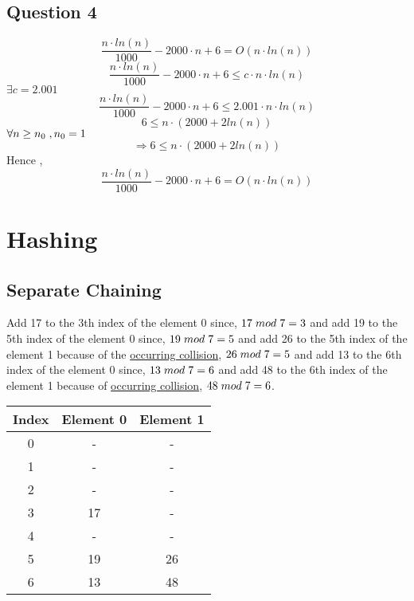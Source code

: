 \documentclass{article}
\begin{document}
\subsection{Question 4}
$$\frac{ n \cdot ln(n)}{1000} - 2000 \cdot n + 6 = O(n \cdot ln(n))$$
$$\frac{ n \cdot ln(n)}{1000} - 2000 \cdot n + 6 \leq c \cdot n \cdot ln(n)$$
$\exists c = 2.001$
$$\frac{ n \cdot ln(n)}{1000} - 2000 \cdot n + 6 \leq 2.001 \cdot n \cdot ln(n)$$
$$6 \leq n \cdot (2000 + 2ln(n))$$
$ \forall n \geq n_0 \hspace{1mm}, n_0 = 1$
$$\Longrightarrow 6 \leq n \cdot (2000 + 2ln(n))$$
Hence , 
$$\frac{ n \cdot ln(n)}{1000} - 2000 \cdot n + 6 = O(n \cdot ln(n))$$

\section{Hashing}

\subsection{Separate Chaining}

Add 17 to the 3th index of the element 0 since, $17 \hspace{1mm} mod \hspace{1mm} 7 = 3$
 and add 19 to the 5th index of the element 0 since, $19 \hspace{1mm} mod \hspace{1mm} 7 = 5$ and add 26 to the 5th index of the element 1 because of the \underline{occurring collision}, $26 \hspace{1mm} mod \hspace{1mm} 7 = 5$ and add 13 to the 6th index of the element 0 since, $13 \hspace{1mm} mod \hspace{1mm} 7 = 6$ and add 48 to the 6th index of the element 1 because of  \underline{occurring collision}, $48 \hspace{1mm} mod \hspace{1mm} 7 = 6$.
\vspace{10mm}
\begin{center}
\begin{tabular}{| c | c | c |} 
 \hline
 Index & Element 0 & Element 1\\ [1ex]
 \hline
 0 & - & -\\ 

 1 & - & -\\

 2 & - & -\\

 3 & 17 & -\\

 4 & - & -\\

 5 & 19 & 26\\

 6 & 13 & 48 \\ 
 \hline
\end{tabular}
\end{center}
\vspace{10mm}
\end{document}
